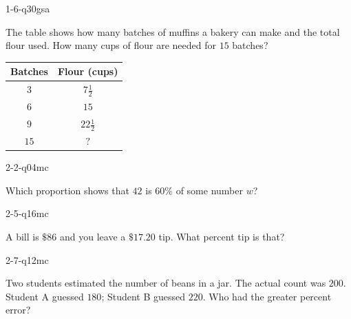 \begin{practiceQuestion}{1-6-q30}{gsa}
\begin{questionText}
The table shows how many batches of muffins a bakery can make and the total flour used. How many cups of flour are needed for $15$ batches?

\begin{center}
\begin{tabular}{|c|c|}
\hline
\textbf{Batches} & \textbf{Flour (cups)} \\ \hline
$3$ & $7\frac{1}{2}$ \\ \hline
$6$ & $15$ \\ \hline
$9$ & $22\frac{1}{2}$ \\ \hline
$15$ & $?$ \\ \hline
\end{tabular}
\end{center}
\end{questionText}
\end{practiceQuestion}

\begin{practiceQuestion}{2-2-q04}{mc}
\begin{questionText}
Which proportion shows that $42$ is $60\%$ of some number $w$?
\end{questionText}
\end{practiceQuestion}

\begin{practiceQuestion}{2-5-q16}{mc}
\begin{questionText}
A bill is $\$86$ and you leave a $\$17.20$ tip. What percent tip is that?
\end{questionText}
\end{practiceQuestion}

\begin{practiceQuestion}{2-7-q12}{mc}
\begin{questionText}
Two students estimated the number of beans in a jar. The actual count was $200$. Student A guessed $180$; Student B guessed $220$. Who had the greater percent error?
\end{questionText}
\end{practiceQuestion}

